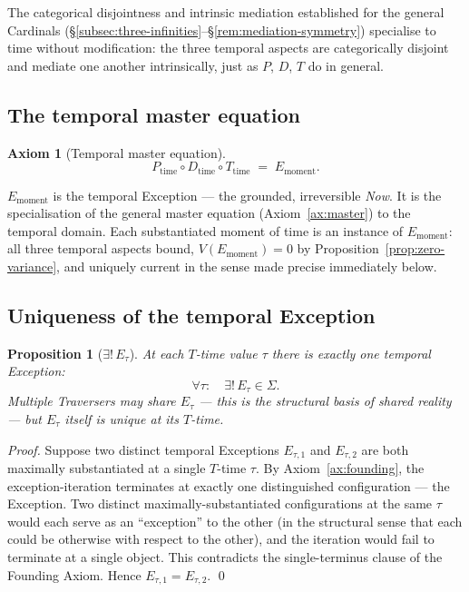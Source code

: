 \documentclass[11pt,a4paper]{article}
\newtheorem{proposition}[theorem]{Proposition}
\theoremstyle{definition}
\newtheorem{axiom}[theorem]{Axiom}
\theoremstyle{remark}
\begin{document}
The categorical disjointness and intrinsic mediation established for the general Cardinals (\S\ref{subsec:three-infinities}--\S\ref{rem:mediation-symmetry}) specialise to time without modification: the three temporal aspects are categorically disjoint and mediate one another intrinsically, just as $P$, $D$, $T$ do in general.

\subsection{The temporal master equation}

\begin{axiom}[Temporal master equation]\label{ax:temporal-master}
\[
\boxed{\;P_{\text{time}} \circ D_{\text{time}} \circ T_{\text{time}} \;=\; E_{\text{moment}}.\;}
\]
\end{axiom}

$E_{\text{moment}}$ is the temporal Exception --- the grounded, irreversible \emph{Now}. It is the specialisation of the general master equation (Axiom~\ref{ax:master}) to the temporal domain. Each substantiated moment of time is an instance of $E_{\text{moment}}$: all three temporal aspects bound, $V(E_{\text{moment}}) = 0$ by Proposition~\ref{prop:zero-variance}, and uniquely current in the sense made precise immediately below.

\subsection{Uniqueness of the temporal Exception}

\begin{proposition}[$\exists!\,E_{\tau}$]\label{prop:unique-E-tau}
At each $T$-time value $\tau$ there is exactly one temporal Exception:
\[
\forall \tau:\quad \exists!\, E_{\tau} \in \Sigma.
\]
Multiple Traversers may share $E_{\tau}$ --- this is the structural basis of shared reality --- but $E_{\tau}$ itself is unique at its $T$-time.
\end{proposition}

\begin{proof}
Suppose two distinct temporal Exceptions $E_{\tau,1}$ and $E_{\tau,2}$ are both maximally substantiated at a single $T$-time $\tau$. By Axiom~\ref{ax:founding}, the exception-iteration terminates at exactly one distinguished configuration --- the Exception. Two distinct maximally-substantiated configurations at the same $\tau$ would each serve as an ``exception'' to the other (in the structural sense that each could be otherwise with respect to the other), and the iteration would fail to terminate at a single object. This contradicts the single-terminus clause of the Founding Axiom. Hence $E_{\tau,1} = E_{\tau,2}$. \qed
\end{proof}
\end{document}
